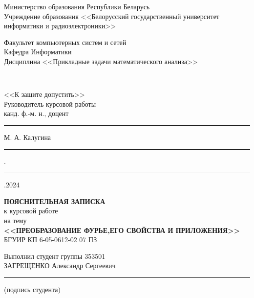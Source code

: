 \begin{titlepage}
  \begin{center}
    Министерство образования Республики Беларусь\\[0.4em]
    Учреждение образования <<Белорусский государственный университет информатики и радиоэлектроники>>\\[2.5em]

    \begin{minipage}{\textwidth}
      \begin{center}
          Факультет компьютерных систем и сетей\\
          Кафедра Информатики\\
          Дисциплина <<Прикладные задачи математического анализа>>
      \end{center}
    \end{minipage}\\[4em]



    \begin{flushright}
      \begin{minipage}{8.7cm}
      \hspace{12.5mm}<<К защите допустить>>\\
      Руководитель курсовой работы\\
      канд. ф.-м. н., доцент\\
      \rule{17ex}{0.3pt} М. А. Калугина\\
      \rule{3ex}{0.3pt}.\rule{4ex}{0.3pt}.2024
    \end{minipage}
    \end{flushright}

    \vspace{3em}

    \textbf{ПОЯСНИТЕЛЬНАЯ ЗАПИСКА}\\
    {к курсовой работе}\\
    {на тему}\\
    \MakeTextUppercase{\textbf{<<Преобразование Фурье,его свойства и приложения>>}}\\[1em]


   {БГУИР КП 6-05-0612-02 07 ПЗ}

    \vspace{2em}

    \begin{flushright}
        \begin{minipage}{8.7cm}
            Выполнил студент группы 353501 \\ 
            ЗАГРЕЩЕНКО Александр Сергеевич \\
            \rule{8.7cm}{0.3pt}
            \vspace{-1.5cm}
            \begin{center}
            \tiny{(подпись студента)}\normalsize
            \end{center} 
            \vspace{1em}
            


\end{minipage}
\end{flushright}
\end{center}
\end{titlepage}
